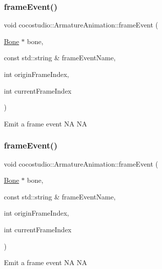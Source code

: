 \subsubsection{\texorpdfstring{frame\+Event()}{frameEvent()}\hspace{0.1cm}{\footnotesize\ttfamily [1/2]}}
{\footnotesize\ttfamily void cocostudio\+::\+Armature\+Animation\+::frame\+Event (\begin{DoxyParamCaption}\item[{\hyperlink{classcocostudio_1_1Bone}{Bone} $\ast$}]{bone,  }\item[{const std\+::string \&}]{frame\+Event\+Name,  }\item[{int}]{origin\+Frame\+Index,  }\item[{int}]{current\+Frame\+Index }\end{DoxyParamCaption})\hspace{0.3cm}{\ttfamily [protected]}}

Emit a frame event  NA  NA \mbox{\label{classcocostudio_1_1ArmatureAnimation_a5dc76e45a42c7e6f3f163554264e90c5}} 
\subsubsection{\texorpdfstring{frame\+Event()}{frameEvent()}\hspace{0.1cm}{\footnotesize\ttfamily [2/2]}}
{\footnotesize\ttfamily void cocostudio\+::\+Armature\+Animation\+::frame\+Event (\begin{DoxyParamCaption}\item[{\hyperlink{classcocostudio_1_1Bone}{Bone} $\ast$}]{bone,  }\item[{const std\+::string \&}]{frame\+Event\+Name,  }\item[{int}]{origin\+Frame\+Index,  }\item[{int}]{current\+Frame\+Index }\end{DoxyParamCaption})\hspace{0.3cm}{\ttfamily [protected]}}

Emit a frame event  NA  NA \mbox{\label{classcocostudio_1_1ArmatureAnimation_a62ad0fdb64386138a022e4fca276f499}} 
